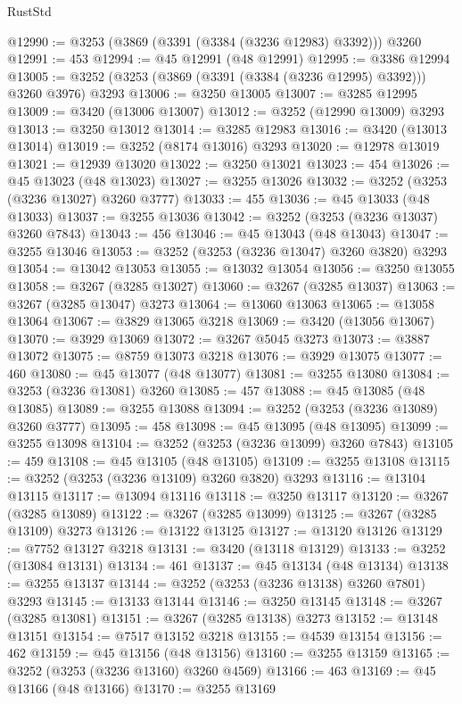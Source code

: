 \begin{lexlean}{RustStd}
\begin{coremodule}
{\begin{coremodule}
{{{{{{{{{{{{{{{{{{{{{{{{{{{{{{{{{{{{{{{@12990 := @3253 (@3869 (@3391 (@3384 (@3236 @12983) @3392))) @3260
@12991 := 453
@12994 := @45 @12991 (@48 @12991)
@12995 := @3386 @12994
@13005 := @3252 (@3253 (@3869 (@3391 (@3384 (@3236 @12995) @3392))) @3260 @3976) @3293
@13006 := @3250 @13005
@13007 := @3285 @12995
@13009 := @3420 (@13006 @13007)
@13012 := @3252 (@12990 @13009) @3293
@13013 := @3250 @13012
@13014 := @3285 @12983
@13016 := @3420 (@13013 @13014)
@13019 := @3252 (@8174 @13016) @3293
@13020 := @12978 @13019
@13021 := @12939 @13020
@13022 := @3250 @13021
@13023 := 454
@13026 := @45 @13023 (@48 @13023)
@13027 := @3255 @13026
@13032 := @3252 (@3253 (@3236 @13027) @3260 @3777)
@13033 := 455
@13036 := @45 @13033 (@48 @13033)
@13037 := @3255 @13036
@13042 := @3252 (@3253 (@3236 @13037) @3260 @7843)
@13043 := 456
@13046 := @45 @13043 (@48 @13043)
@13047 := @3255 @13046
@13053 := @3252 (@3253 (@3236 @13047) @3260 @3820) @3293
@13054 := @13042 @13053
@13055 := @13032 @13054
@13056 := @3250 @13055
@13058 := @3267 (@3285 @13027)
@13060 := @3267 (@3285 @13037)
@13063 := @3267 (@3285 @13047) @3273
@13064 := @13060 @13063
@13065 := @13058 @13064
@13067 := @3829 @13065 @3218
@13069 := @3420 (@13056 @13067)
@13070 := @3929 @13069
@13072 := @3267 @5045 @3273
@13073 := @3887 @13072
@13075 := @8759 @13073 @3218
@13076 := @3929 @13075
@13077 := 460
@13080 := @45 @13077 (@48 @13077)
@13081 := @3255 @13080
@13084 := @3253 (@3236 @13081) @3260
@13085 := 457
@13088 := @45 @13085 (@48 @13085)
@13089 := @3255 @13088
@13094 := @3252 (@3253 (@3236 @13089) @3260 @3777)
@13095 := 458
@13098 := @45 @13095 (@48 @13095)
@13099 := @3255 @13098
@13104 := @3252 (@3253 (@3236 @13099) @3260 @7843)
@13105 := 459
@13108 := @45 @13105 (@48 @13105)
@13109 := @3255 @13108
@13115 := @3252 (@3253 (@3236 @13109) @3260 @3820) @3293
@13116 := @13104 @13115
@13117 := @13094 @13116
@13118 := @3250 @13117
@13120 := @3267 (@3285 @13089)
@13122 := @3267 (@3285 @13099)
@13125 := @3267 (@3285 @13109) @3273
@13126 := @13122 @13125
@13127 := @13120 @13126
@13129 := @7752 @13127 @3218
@13131 := @3420 (@13118 @13129)
@13133 := @3252 (@13084 @13131)
@13134 := 461
@13137 := @45 @13134 (@48 @13134)
@13138 := @3255 @13137
@13144 := @3252 (@3253 (@3236 @13138) @3260 @7801) @3293
@13145 := @13133 @13144
@13146 := @3250 @13145
@13148 := @3267 (@3285 @13081)
@13151 := @3267 (@3285 @13138) @3273
@13152 := @13148 @13151
@13154 := @7517 @13152 @3218
@13155 := @4539 @13154
@13156 := 462
@13159 := @45 @13156 (@48 @13156)
@13160 := @3255 @13159
@13165 := @3252 (@3253 (@3236 @13160) @3260 @4569)
@13166 := 463
@13169 := @45 @13166 (@48 @13166)
@13170 := @3255 @13169
}}}}}}}}}}}}}}}}}}}}}}}}}}}}}}}}}}}}}}}
\end{coremodule}}
\end{coremodule}
\end{lexlean}
